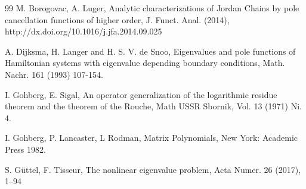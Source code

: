 \documentclass[11pt, reqno]{amsart}
\theoremstyle{plain}
\theoremstyle{remark}
\newcounter{str}
\numberwithin{equation}{section}
\begin{document}
\begin{thebibliography}{99}
 M. Borogovac, A. Luger, Analytic characterizations of Jordan Chains by pole cancellation functions of higher order, J. Funct. Anal. (2014), http://dx.doi.org/10.1016/j.jfa.2014.09.025 







 A. Dijksma, H. Langer and H. S. V. de Snoo, Eigenvalues and pole functions of Hamiltonian systems with eigenvalue depending boundary conditions, Math. Nachr. 161 (1993) 107-154. 

 I. Gohberg, E. Sigal, An operator generalization of the logarithmic residue theorem and the theorem of the Rouche, Math USSR Sbornik, Vol. 13 (1971) Ni. 4.

 I. Gohberg, P. Lancaster, L Rodman, Matrix Polynomials, New York: Academic Press 1982.

 S. G\"{u}ttel, F. Tisseur, The nonlinear eigenvalue problem, Acta
Numer. 26 (2017), 1–94





\end{thebibliography}
\end{document}
